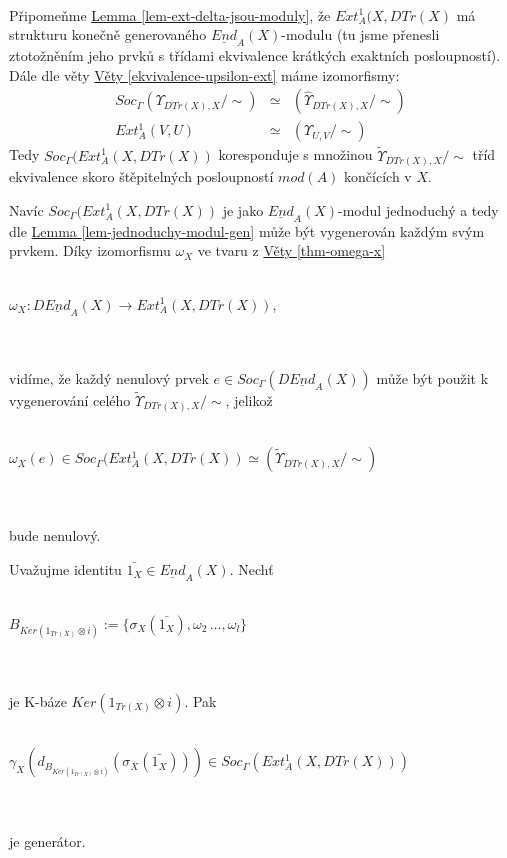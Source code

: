       \paragraph{ }\label{phi-omega-nenul}
      Připomeňme \hyperref[lem-ext-delta-jsou-moduly]{Lemma \ref*{lem-ext-delta-jsou-moduly}}, 
      že $Ext^1_A(X,DTr(X)$ má strukturu konečně generovaného $\underline{End}_A(X)$-modulu 
      (tu jsme přenesli ztotožněním jeho prvků s třídami ekvivalence krátkých exaktních posloupností).
      Dále dle věty \hyperref[ekvivalence-upsilon-ext]{Věty \ref*{ekvivalence-upsilon-ext}} 
      máme izomorfismy:
      \begin{eqnarray}
         Soc_\Gamma(\Upsilon_{DTr(X),X}/\sim)&\simeq&(\hat{\Upsilon}_{DTr(X),X}/\sim) \nonumber \\
         Ext_A^1(V,U)&\simeq& (\Upsilon_{U,V}/\sim) \nonumber 
      \end{eqnarray}      
      Tedy $Soc_\Gamma(Ext^1_A(X,DTr(X))$ koresponduje s množinou $\tilde{\Upsilon}_{DTr(X),X}/\sim$ tříd 
      ekvivalence skoro štěpitelných posloupností $mod(A)$ končících v $X$.
      
      Navíc $Soc_\Gamma(Ext^1_A(X,DTr(X))$ je jako $\underline{End}_A(X)$-modul 
      jednoduchý a tedy dle \hyperref[lem-jednoduchy-modul-gen]{Lemma \ref*{lem-jednoduchy-modul-gen}}
      může být vygenerován každým svým prvkem. Díky izomorfismu $\omega_X$ ve tvaru z
      \hyperref[thm-omega-x]{Věty \ref*{thm-omega-x}} \\\\
        \centerline{$\omega_X: D\underline{End}_A(X) \rightarrow Ext_A^1(X,DTr(X))$,} 
        \\\\
      vidíme, že každý nenulový prvek $e\in Soc_\Gamma(D\underline{End}_A(X))$ 
      může být použit k vygenerování celého $\tilde{\Upsilon}_{DTr(X),X}/\sim$, jelikož
      \\\\
      \centerline{$\omega_X(e)\in Soc_\Gamma(Ext^1_A(X,DTr(X))\simeq (\tilde{\Upsilon}_{DTr(X),X}/\sim)$} \\\\
      bude nenulový.     
    
      \begin{lem}\label{lem-B-ker}
        Uvažujme identitu $\bar{1_X}\in\underline{End}_A(X)$. Nechť \\\\
        \centerline{$B_{Ker(1_{Tr(X)}\otimes i)}:=\{\sigma_X(\bar{1_X}),\omega_2\,\ldots,\omega_l\}$} \\\\
        je K-báze $Ker(1_{Tr(X)}\otimes i)$. Pak \\\\
        \centerline{$\gamma_X(d_{B_{Ker(1_{Tr(X)}\otimes i)}}(\sigma_X(\bar{1_X})))
        \in Soc_\Gamma(Ext^1_A(X,DTr(X)))$} \\\\
        je generátor.
      \end{lem}
      

